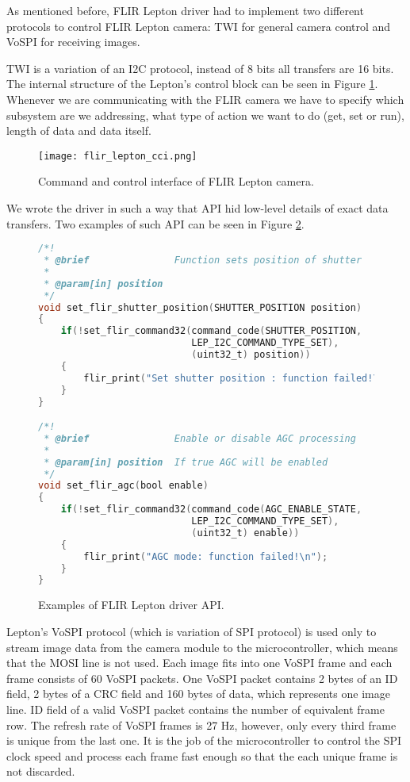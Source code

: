 As mentioned before, FLIR Lepton driver had to implement two different protocols to control FLIR Lepton camera: TWI for general camera control and VoSPI for receiving images.

TWI is a variation of an I2C protocol, instead of 8 bits all transfers are 16 bits.
The internal structure of the Lepton's control block can be seen in Figure \ref{flir_lepton_cci}.
Whenever we are communicating with the FLIR camera we have to specify which subsystem are we addressing, what type of action we want to do (get, set or run), length of data and data itself.

\begin{figure}[ht]
        \centering
        \texttt{[image: flir\_lepton\_cci.png]} 
        \caption{ Command and control interface of FLIR Lepton camera.} 
        \label{flir_lepton_cci}
\end{figure}

We wrote the driver in such a way that API hid low-level details of exact data transfers. 
Two examples of such API can be seen in Figure \ref{flir_api}.

\lstset{style=mystyle}
\begin{figure}[ht] 
\begin{lstlisting}[language=C]
/*!
 * @brief               Function sets position of shutter
 *
 * @param[in] position  
 */
void set_flir_shutter_position(SHUTTER_POSITION position)
{ 
    if(!set_flir_command32(command_code(SHUTTER_POSITION, 
                           LEP_I2C_COMMAND_TYPE_SET), 
                           (uint32_t) position))
    {
        flir_print("Set shutter position : function failed!\n");
    }
}

/*!
 * @brief               Enable or disable AGC processing
 *
 * @param[in] position  If true AGC will be enabled
 */
void set_flir_agc(bool enable)
{
    if(!set_flir_command32(command_code(AGC_ENABLE_STATE, 
                           LEP_I2C_COMMAND_TYPE_SET), 
                           (uint32_t) enable))
    {
        flir_print("AGC mode: function failed!\n");
    }
}
\end{lstlisting}
    \caption{ Examples of FLIR Lepton driver API.}
    \label{flir_api}
\end{figure}

Lepton's VoSPI protocol (which is variation of SPI protocol) is used only to stream image data from the camera module to the microcontroller, which means that the MOSI line is not used.
Each image fits into one VoSPI frame and each frame consists of 60 VoSPI packets.
One VoSPI packet contains 2 bytes of an ID field, 2 bytes of a CRC field and 160 bytes of data\footnotemark, which represents one image line.
ID field of a valid VoSPI packet contains the number of equivalent frame row.
The refresh rate of VoSPI frames is 27 \si{\hertz}, however, only every third frame is unique from the last one.
It is the job of the microcontroller to control the SPI clock speed and process each frame fast enough so that the each unique frame is not discarded.

